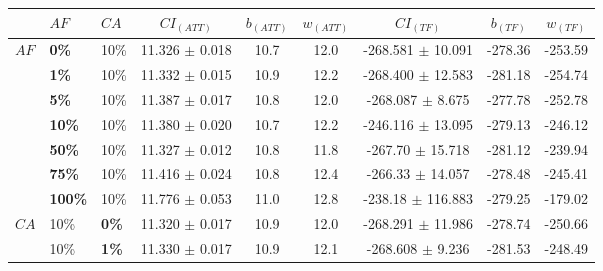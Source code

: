 \begin{sidewaystable}
    \begin{tabular}{|l|l|l||c|c|c|c|c|c|}
    \hline
    ~ & $AF$ & $CA$ & $CI_{(ATT)}$ & $b_{(ATT)}$ & $w_{(ATT)}$ & $CI_{(TF)}$ & $b_{(TF)}$ & $w_{(TF)}$ \\
    \hline
    $AF$ & \textbf{0\%} & 10\% & 11.326 $\pm$ 0.018 & 10.7 & 12.0 & -268.581 $\pm$ 10.091 & -278.36 & -253.59 \\
    ~ & \textbf{1\%} & 10\% & 11.332 $\pm$ 0.015 & 10.9 & 12.2 & -268.400 $\pm$ 12.583  & -281.18 & -254.74 \\
    ~ & \textbf{5\%} & 10\% & 11.387 $\pm$ 0.017 & 10.8 & 12.0 & -268.087 $\pm$ 8.675 & -277.78 & -252.78 \\ 
    ~ & \textbf{10\%} & 10\% & 11.380 $\pm$ 0.020 & 10.7 & 12.2 & -246.116 $\pm$ 13.095 & -279.13 & -246.12 \\ 
    ~ & \textbf{50\%} & 10\% & 11.327 $\pm$ 0.012 & 10.8 & 11.8 & -267.70 $\pm$ 15.718 & -281.12& -239.94 \\ 
    ~ & \textbf{75\%} & 10\% & 11.416 $\pm$ 0.024 & 10.8 & 12.4 & -266.33 $\pm$ 14.057 & -278.48 & -245.41 \\ 
    ~ & \textbf{100\%} & 10\% & 11.776 $\pm$ 0.053 & 11.0 & 12.8 & -238.18 $\pm$ 116.883 & -279.25 & -179.02 \\ 
    \hline
    $CA$ & 10\% &\textbf{0\%} & 11.320 $\pm$ 0.017 & 10.9 & 12.0 & -268.291 $\pm$ 11.986 & -278.74 & -250.66 \\
    ~ & 10\% &\textbf{1\%} & 11.330 $\pm$ 0.017 & 10.9 & 12.1 & -268.608 $\pm$ 9.236 & -281.53 & -248.49 \\


\end{tabular}
\end{sidewaystable}
